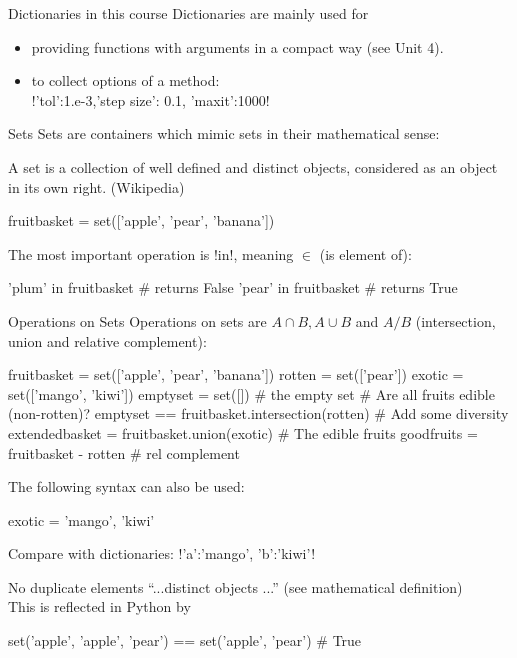 \documentclass[hyperref={pdfpagelabels=false},table,handout]{beamer}
\begin{document}
\begin{frame}[fragile]{Dictionaries in this course}
Dictionaries are mainly used for
\vfill
\begin{itemize}
\item providing functions with arguments in a compact way (see Unit 4).
\item to collect options of a method:\\ \pyth!{'tol':1.e-3,'step size': 0.1, 'maxit':1000}!
\end{itemize}
\vfill

\end{frame}

\begin{frame}[fragile]{Sets}
Sets are containers which mimic sets in their mathematical sense:
\begin{definition}
A \alert{set} is a collection of well defined and distinct objects, considered as an object in its own right.
{\footnotesize (Wikipedia)}
\end{definition}
\vfill
\begin{python}
fruitbasket = set(['apple', 'pear', 'banana'])
\end{python}
\vfill
The most important operation is \pyth!in!, meaning $\in$ (is element of):
\begin{python}
'plum' in fruitbasket  # returns False
'pear' in fruitbasket  # returns True
\end{python}
\end{frame}

\begin{frame}[fragile]{Operations on Sets}
Operations on sets are $A \cap B, A \cup B$ and $A / B$ (intersection, union and relative complement):
\begin{python}
fruitbasket = set(['apple', 'pear', 'banana'])
rotten = set(['pear'])
exotic = set(['mango', 'kiwi'])
emptyset = set([])        # the empty set
# Are all fruits edible (non-rotten)?
emptyset == fruitbasket.intersection(rotten)
# Add some diversity
extendedbasket = fruitbasket.union(exotic)
# The edible fruits
goodfruits = fruitbasket - rotten # rel complement
\end{python}
The following syntax can also be used:
\begin{python}
  exotic = {'mango', 'kiwi'}
\end{python}
Compare with dictionaries: \pyth!{'a':'mango', 'b':'kiwi'}!
\end{frame}

\begin{frame}[fragile]{No duplicate elements}
``...distinct objects ...'' (see mathematical definition)\\
\vfill
This is reflected in Python by
\begin{python}
set({'apple', 'apple', 'pear'})
 == set({'apple', 'pear'}) # True
\end{python}
\vfill
\end{frame}
\end{document}
